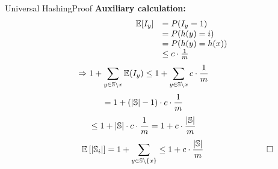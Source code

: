 
\begin{frame}{Universal Hashing}{Proof}
  \textbf{Auxiliary calculation:}
         {\color{Mittel-Blau}
           \vspace*{-2em}
           \begin{align*}
             \hspace{6em}           
             \begin{array}{rl}
               \mathbb{E}[I_y] & = P(I_y = 1)\\
               {} & = P(h(y) = i)\\
               {} & = P(h(y) = h(x))\\
               {} & \leq c \cdot \frac{1}{m}
             \end{array}
         \end{align*}}
         {\color{Mittel-Blau}
           \vspace{-0.6em}
           \begin{displaymath}
             \hspace*{-3em}
             \Rightarrow 1 + \sum_{y \in \mathbb{S} \setminus x} \E(I_y)
             \leq 1 + \sum_{y \in \mathbb{S} \setminus x} c \cdot \frac{1}{m}
           \end{displaymath}
           \vspace{-0.6em}
           \begin{displaymath}
             \hspace*{-3em}
             = 1 + \left(\vert \mathbb{S}  \vert - 1\right) \cdot c \cdot \frac{1}{m}
           \end{displaymath}
           \vspace{-0.6em}
           \begin{displaymath}
             \hspace*{-3em}
             \displaystyle \leq 1 + \vert \mathbb{S} \vert \cdot c \cdot \frac{1}{m}
             = 1 + c \cdot \frac{\vert \mathbb{S} \vert}{m}
           \end{displaymath}
           \vspace{-0.6em}
           \begin{displaymath}
             \hspace*{5em}
             \mathbb{E}\left[\vert \mathbb{S}_i \vert\right]
             = 1 + \sum_{y \in \mathbb{S} \setminus \{x\}}
             \leq 1 + c \cdot \frac{\vert \mathbb{S} \vert}{m}
             \hspace*{7.5em}\square
         \end{displaymath}}
\end{frame}
